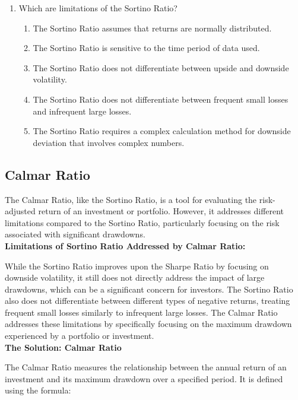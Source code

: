 \documentclass{article}
\begin{document}
\begin{enumerate}
    \item Which are limitations of the Sortino Ratio?
    \begin{enumerate}
        \item The Sortino Ratio assumes that returns are normally distributed.
        \item The Sortino Ratio is sensitive to the time period of data used.
        \item The Sortino Ratio does not differentiate between upside and downside volatility.
        \item The Sortino Ratio does not differentiate between frequent small losses and infrequent large losses.
        \item The Sortino Ratio requires a complex calculation method for downside deviation that involves complex numbers.
    \end{enumerate}


\end{enumerate}

\clearpage

\subsection{Calmar Ratio}

The Calmar Ratio, like the Sortino Ratio, is a tool for evaluating the risk-adjusted return of an investment or portfolio. However, it addresses different limitations compared to the Sortino Ratio, particularly focusing on the risk associated with significant drawdowns. \\

\textbf{Limitations of Sortino Ratio Addressed by Calmar Ratio:}

While the Sortino Ratio improves upon the Sharpe Ratio by focusing on downside volatility, it still does not directly address the impact of large drawdowns, which can be a significant concern for investors. The Sortino Ratio also does not differentiate between different types of negative returns, treating frequent small losses similarly to infrequent large losses. The Calmar Ratio addresses these limitations by specifically focusing on the maximum drawdown experienced by a portfolio or investment. \\

\textbf{The Solution: Calmar Ratio}

The Calmar Ratio measures the relationship between the annual return of an investment and its maximum drawdown over a specified period. It is defined using the formula:
\end{document}
